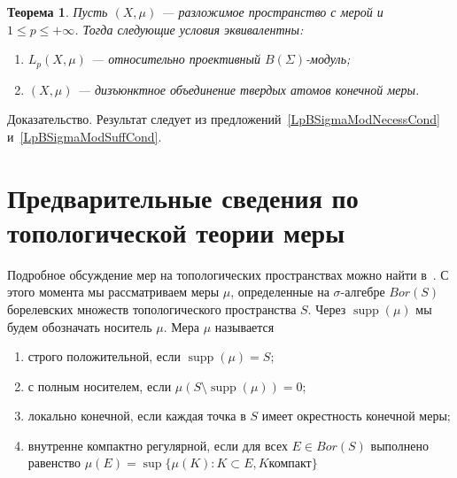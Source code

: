 \documentclass[12pt]{article}
\numberwithin{equation}{subsection}
\theoremstyle{plain}
\newtheorem{theorem}{Теорема}
\newenvironment{proof}{Доказательство.}{}
\begin{document}
\begin{fulltext}
    \begin{theorem}\label{LpBSigmaModCrit} Пусть $(X,\mu)$ --- разложимое
        пространство с мерой и $1\leq p\leq +\infty$. Тогда следующие условия
        эквивалентны:
        \begin{enumerate}[label = (\roman*)]
            \item $L_p(X,\mu)$ --- относительно проективный $B(\Sigma)$-модуль;

            \item $(X,\mu)$ --- дизъюнктное объединение твердых атомов конечной
                  меры.
        \end{enumerate}
    \end{theorem}
    \begin{proof} Результат следует из предложений~\ref{LpBSigmaModNecessCond}
        и~\ref{LpBSigmaModSuffCond}.
    \end{proof}


    \section{Предварительные сведения по топологической теории
      меры}\label{SectionPreliminariesOnTopologicalMeasureTheory}

    Подробное обсуждение мер на топологических пространствах можно найти
    в~\cite{FremMeasTh4.1}. С этого момента мы рассматриваем меры $\mu$,
    определенные на $\sigma$-алгебре $Bor(S)$ борелевских множеств
    топологического пространства $S$. Через $\operatorname{supp}(\mu)$ мы будем
    обозначать носитель $\mu$. Мера $\mu$ называется

    \begin{enumerate}[label = (\roman*)]
        \item строго положительной, если $\operatorname{supp}(\mu)=S$;

        \item с полным носителем, если
              $\mu(S\setminus\operatorname{supp}(\mu))=0$;

        \item локально конечной, если каждая точка в $S$ имеет окрестность
              конечной меры;

        \item внутренне компактно регулярной, если для всех $E\in Bor(S)$
              выполнено равенство $\mu(E)=\sup \{\mu(K): K\subset E, K\mbox{
                      компакт} \}$


\end{enumerate}
\end{fulltext}
\end{document}
